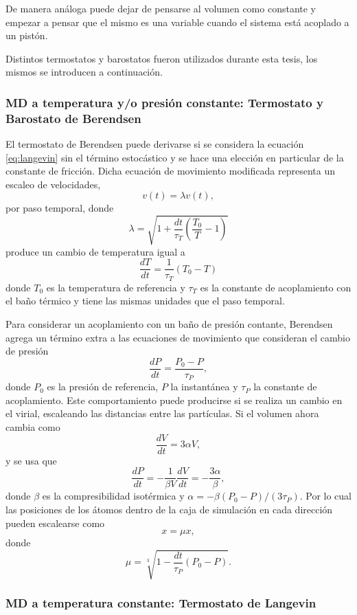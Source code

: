 De manera análoga puede dejar de pensarse al volumen como constante y empezar a
pensar que el mismo es una variable cuando el sistema está acoplado a un pistón.

Distintos termostatos y barostatos fueron utilizados durante esta tesis, los mismos 
se introducen a continuación.

\subsubsection{MD a temperatura y/o presión constante: Termostato y Barostato 
de Berendsen}

El termostato de Berendsen \cite{berendsen1984} puede derivarse si se considera 
la ecuación \ref{eq:langevin} sin el término estocástico y se hace una elección
en particular de la constante de fricción. Dicha ecuación de movimiento modificada
representa un escaleo de velocidades, 
$$
v(t) = \lambda v(t),
$$
por paso temporal, donde
$$
\lambda = \sqrt{1 + \frac{dt}{\tau_T} \left( \frac{T_0}{T} - 1 \right)}
$$
produce un cambio de temperatura igual a
$$
\frac{dT}{dt} = \frac{1}{\tau_T} (T_0 - T)
$$
donde $T_0$ es la temperatura de referencia y  $\tau_T$ es la constante de
acoplamiento con el baño térmico y tiene las mismas unidades que el paso temporal.

Para considerar un acoplamiento con un baño de presión contante, Berendsen 
\cite{berendsen1984} agrega un término extra a las ecuaciones de movimiento que
consideran el cambio de presión
$$
\frac{dP}{dt} = \frac{P_0 - P}{\tau_P},
$$
donde $P_0$ es la presión de referencia, $P$ la instantánea y $\tau_P$ la 
constante de acoplamiento. Este comportamiento puede producirse si se realiza un
cambio en el virial, escaleando las distancias entre las partículas. Si el 
volumen ahora cambia como 
$$
\frac{dV}{dt} = 3 \alpha V,
$$
y se usa que
$$
\frac{dP}{dt} = - \frac{1}{\beta V} \frac{dV}{dt} = -\frac{3\alpha}{\beta},
$$
donde $\beta$ es la compresibilidad isotérmica y $\alpha = - \beta (P_0 - P) / (3 \tau_P)$.
Por lo cual las posiciones de los átomos dentro de la caja de simulación en cada
dirección pueden escalearse como
$$
x = \mu x,
$$
donde
$$
\mu = \sqrt[3]{1 - \frac{dt}{\tau_P} (P_0 - P)}.
$$

\subsubsection{MD a temperatura constante: Termostato de Langevin}

